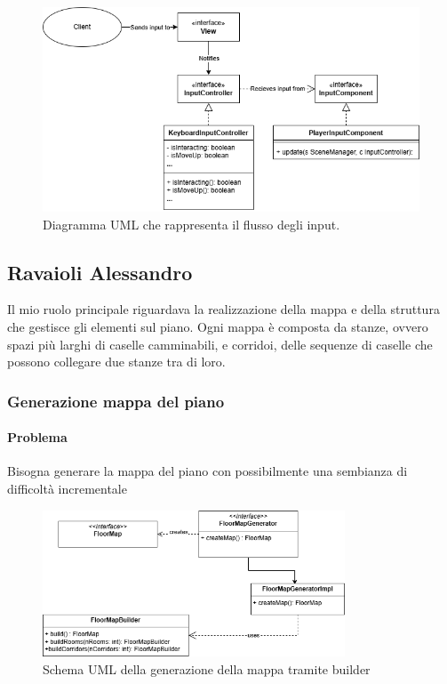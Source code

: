 \documentclass{report}
\begin{document}
\begin{figure}[H]
    \centering
    \includegraphics[width=13cm]{ObserverPattern.png}
    \caption{Diagramma UML che rappresenta il flusso degli input.}
    \label{img:ObserverPattern.png}
\end{figure}


\subsection{Ravaioli Alessandro}

Il mio ruolo principale riguardava la realizzazione della mappa e della struttura che gestisce gli elementi sul piano.
%
Ogni mappa è composta da stanze, ovvero spazi più larghi di caselle camminabili, e corridoi, delle sequenze di caselle che possono collegare due stanze tra di loro.
%

\subsubsection{Generazione mappa del piano}

\paragraph{Problema} Bisogna generare la mappa del piano con possibilmente una sembianza di difficoltà incrementale

\begin{figure}[H]
    \centering
    \includegraphics[width=9cm]{mapUMLdiagram.png}
    \caption{Schema UML della generazione della mappa tramite builder}
    \label{img:mapBuilder}
\end{figure}
\end{document}
